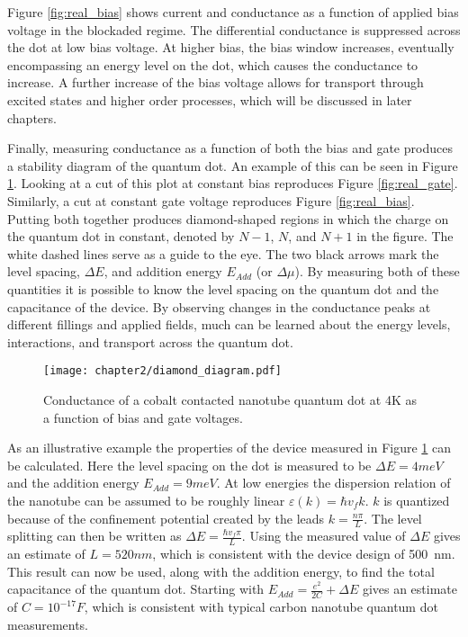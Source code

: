 Figure \ref{fig:real_bias} shows current and conductance as a function of applied bias voltage in the blockaded regime. The differential conductance is suppressed across the dot at low bias voltage. At higher bias, the bias window increases, eventually encompassing an energy level on the dot, which causes the conductance to increase. A further increase of the bias voltage allows for transport through excited states and higher order processes, which will be discussed in later chapters.

Finally, measuring conductance as a function of both the bias and gate produces a stability diagram of the quantum dot. An example of this can be seen in Figure \ref{fig:coulomb_diamonds}. Looking at a cut of this plot at constant bias reproduces Figure \ref{fig:real_gate}. Similarly, a cut at constant gate voltage reproduces Figure \ref{fig:real_bias}. Putting both together produces diamond-shaped regions in which the charge on the quantum dot in constant, denoted by $N-1$, $N$, and $N+1$ in the figure. The white dashed lines serve as a guide to the eye. The two black arrows mark the level spacing, $\Delta E$, and addition energy $E_{Add}$ (or $\Delta \mu$). By measuring both of these quantities it is possible to know the level spacing on the quantum dot and the capacitance of the device. By observing changes in the conductance peaks at different fillings and applied fields, much can be learned about the energy levels, interactions, and transport across the quantum dot.

\begin{figure}
    \centering
    \texttt{[image: chapter2/diamond\_diagram.pdf]}
    \caption{Conductance of a cobalt contacted nanotube quantum dot at 4K as a function of bias and gate voltages.}
    \label{fig:coulomb_diamonds}
\end{figure}

As an illustrative example the properties of the device measured in Figure \ref{fig:coulomb_diamonds} can be calculated. Here the level spacing on the dot is measured to be $\Delta E = 4meV$ and the addition energy $E_{Add} = 9meV$. At low energies the dispersion relation of the nanotube can be assumed to be roughly linear $\varepsilon(k) = \hbar v_f k$. $k$ is quantized because of the confinement potential created by the leads $k = \frac{n\pi}{L}$. The level splitting can then be written as $\Delta E = \frac{\hbar v_f \pi}{L}$. Using the measured value of $\Delta E$ gives an estimate of $L = 520nm$, which is consistent with the device design of \SI{500}{\nano\meter}. This result can now be used, along with the addition energy, to find the total capacitance of the quantum dot. Starting with $E_{Add} = \frac{e^2}{2C} + \Delta E$ gives an estimate of $C=10^{-17}F$, which is consistent with typical carbon nanotube quantum dot measurements.